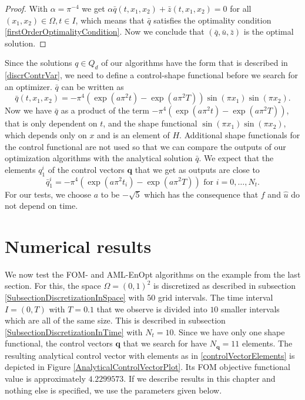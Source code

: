 \begin{proof}
With $\alpha=\pi^{-4}$ we get $\alpha\bar{q}(t,x_1,x_2)+\bar{z}(t,x_1,x_2)=0$ for all $(x_1,x_2)\in\Omega, t\in I$, which means that $\bar{q}$ satisfies the optimality condition \eqref{firstOrderOptimalityCondition}. Now we conclude that $(\bar{q}, \bar{u}, \bar{z})$ is the optimal solution.
\end{proof}

Since the solutions $q\in Q_d$ of our algorithms have the form that is described in \eqref{discrContrVar}, we need to define a control-shape functional before we search for an optimizer. $\bar{q}$ can be written as
\begin{displaymath}
\bar{q}(t,x_1,x_2)=-\pi^4(\exp(a\pi^2t)-\exp(a\pi^2T))\sin(\pi x_1)\sin(\pi x_2).
\end{displaymath}
Now we have $\bar{q}$ as a product of the term $-\pi^4(\exp(a\pi^2t)-\exp(a\pi^2T))$, that is only dependent on $t$, and the shape functional $\sin(\pi x_1)\sin(\pi x_2)$, which depends only on $x$ and is an element of $H$. Additional shape functionals for the control functional are not used so that we can compare the outputs of our optimization algorithms with the analytical solution $\bar{q}$. We expect that the elements $q^i_1$ of the control vectors $\mathbf{q}$ that we get as outputs are close to
\begin{equation}
\label{controlVectorElements}
\bar{q}^i_1=-\pi^4(\exp(a\pi^2t_i)-\exp(a\pi^2T))\text{ for }i=0,\dotsc,N_t.
\end{equation}
For our tests, we choose $a$ to be $-\sqrt{5}$ which has the consequence that $f$ and $\hat{u}$ do not depend on time.

\section{Numerical results}

We now test the FOM- and AML-EnOpt algorithms on the example from the last section. For this, the space $\Omega=(0,1)^2$ is discretized as described in subsection \ref{SubsectionDiscretizationInSpace} with $50$ grid intervals. The time interval $I=(0,T)$ with $T=0.1$ that we observe is divided into $10$ smaller intervals which are all of the same size. This is described in subsection \ref{SubsectionDiscretizationInTime} with $N_t=10$. Since we have only one shape functional, the control vectors $\mathbf{q}$ that we search for have $N_\mathbf{q}=11$ elements. The resulting analytical control vector with elements as in \eqref{controlVectorElements} is depicted in Figure \ref{AnalyticalControlVectorPlot}. Its FOM objective functional value is approximately $4.2299573$. If we describe results in this chapter and nothing else is specified, we use the parameters given below.\\

